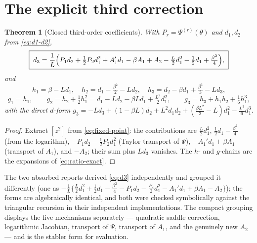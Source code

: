 \documentclass[11pt,oneside]{article}
\numberwithin{equation}{section}
\newtheorem{theorem}{Theorem}[section]
\theoremstyle{definition}
\theoremstyle{remark}
\begin{document}
\section{The explicit third correction}
\label{sec:third-order}

\begin{theorem}[Closed third-order coefficients]
\label{thm:third-order}
With $P_r=\Psi^{(r)}(\theta)$ and $d_1,d_2$ from
\eqref{eq:d1-d2},
\begin{equation}
 \boxed{\;
 d_3=\frac1L\Bigl(
 P_1d_2+\tfrac12P_2d_1^{2}+A_1'd_1-\beta A_1+A_2
 -\tfrac L2d_1^{2}-\tfrac12d_1+\tfrac{\beta^{2}}4
 \Bigr),
 \;}
 \label{eq:d3}
\end{equation}
and
\begin{equation}
 h_1=\beta-Ld_1,\quad
 h_2=d_1-\tfrac{\beta^{2}}2-Ld_2,\quad
 h_3=d_2-\beta d_1+\tfrac{\beta^{3}}3-Ld_3,
 \label{eq:h123}
\end{equation}
\begin{equation}
 g_1=h_1,\qquad
 g_2=h_2+\tfrac12h_1^{2}
 =d_1-Ld_2-\beta Ld_1+\tfrac{L^{2}}2d_1^{2},
 \qquad
 g_3=h_3+h_1h_2+\tfrac16h_1^{3},
 \label{eq:g123}
\end{equation}
with the direct $d$-form
$g_3=-Ld_3+(1-\beta L)d_2+L^{2}d_1d_2
+(\tfrac{\beta L^{2}}2-L)d_1^{2}-\tfrac{L^{3}}6d_1^{3}$.
\end{theorem}

\begin{proof}
Extract $[z^{2}]$ from \eqref{eq:fixed-point}: the contributions are
$\tfrac L2d_1^{2}$, $\tfrac12d_1-\tfrac{\beta^{2}}4$ (from the
logarithm), $-P_1d_2-\tfrac12P_2d_1^{2}$ (Taylor transport of
$\Psi$), $-A_1'd_1+\beta A_1$ (transport of $A_1$), and $-A_2$; their
sum plus $Ld_3$ vanishes.  The $h$- and $g$-chains are the expansions
of \eqref{eq:ratio-exact}.
\end{proof}

\begin{remark}
The two absorbed reports derived \eqref{eq:d3} independently and
grouped it differently (one as
$-\tfrac1L\{\tfrac L2d_1^{2}+\tfrac12d_1-\tfrac{\beta^{2}}4
-P_1d_2-\tfrac{P_2}2d_1^{2}-A_1'd_1+\beta A_1-A_2\}$); the forms are
algebraically identical, and both were checked symbolically against
the triangular recursion in their independent implementations.  The
compact grouping displays the five mechanisms separately ---
quadratic saddle correction, logarithmic Jacobian, transport of
$\Psi$, transport of $A_1$, and the genuinely new $A_2$ --- and is
the stabler form for evaluation.
\end{remark}
\end{document}
